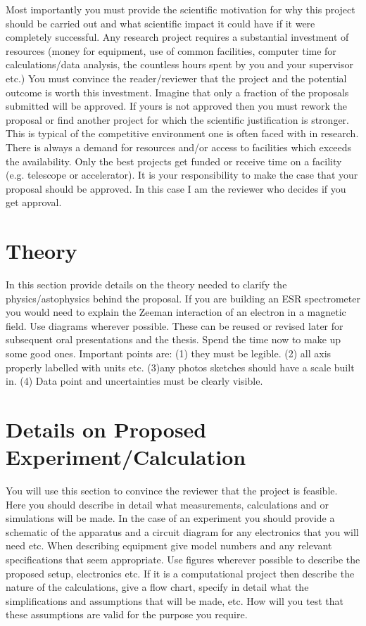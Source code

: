 \documentclass[twocolumn,showpacs,preprintnumbers,amsmath,amssymb]{revtex4}
\begin{document}
Most importantly you must provide  the scientific motivation for why this project should be carried out and what scientific impact it could have if  it were completely successful. Any research project requires a substantial  investment of resources (money for equipment, use of common facilities, computer time for calculations/data analysis, the countless hours spent by you and your supervisor etc.) You must convince  the reader/reviewer that the project and the potential outcome is worth this investment. Imagine that only a fraction of the  proposals submitted will be approved. If yours is not approved then you must rework the proposal or find another project for which the scientific justification is stronger.  This is typical of the competitive  environment one is often faced with in research. There is always  a demand for  resources and/or access to facilities which exceeds the availability.  Only the best projects get funded or receive time on a facility (e.g. telescope or accelerator). It is  your responsibility to make the case that your proposal  should be  approved. In this case I am the reviewer who decides if you get approval.


\section{Theory}

In this section provide details on the theory  needed to clarify the physics/astophysics behind the proposal. If you are building an ESR spectrometer you would need to explain the Zeeman interaction of an electron in a magnetic field. Use diagrams wherever possible. These can be reused or revised
later for subsequent oral presentations and the thesis. Spend the time now to make up some good ones.
Important  points are: (1) they must be  legible. (2) all axis properly labelled with units  etc. (3)any photos sketches should have a scale built in.   (4) Data point and uncertainties  must  be clearly visible.  


\section{Details on Proposed Experiment/Calculation} 


You will use this section to convince the reviewer that the project is feasible.
Here you should describe in detail what measurements, calculations and or simulations will be made. In the case of  an experiment you should provide a schematic of the apparatus  and a circuit diagram for any electronics that you will need etc.    
When describing equipment give model numbers and any relevant specifications that seem appropriate.
Use figures wherever possible to describe 
the proposed setup, electronics etc. If it is a  computational project then describe the nature of the calculations, give a flow chart,  specify in detail what the simplifications and assumptions that will be made,   etc.  How  will you test  that these assumptions are valid for the purpose you require.
\end{document}
